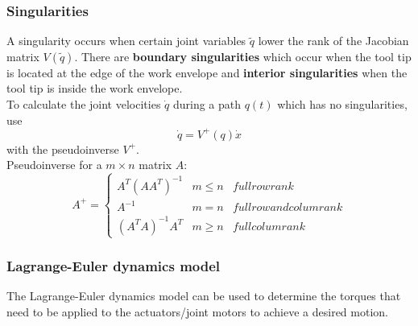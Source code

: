 \documentclass[12pt]{article}
\begin{document}
	\subsubsection{Singularities}
	A singularity occurs when certain joint variables $\tilde{q}$ lower the rank of the Jacobian matrix $V(\tilde{q})$. There are \textbf{boundary singularities} which occur when the tool tip is located at the edge of the work envelope and \textbf{interior singularities} when the tool tip is inside the work envelope.\\
	To calculate the joint velocities $\dot{q}$ during a path $q(t)$ which has no singularities, use $$\dot{q} = V^+(q) \dot{x}$$ with the pseudoinverse $V^+$.\\
	Pseudoinverse for a $m \times n$ matrix $A$:
	\begin{equation}
	A^+ = 
	\left\{ \begin{array}{lll}
	A^T(AA^T)^{-1} & m \leq n & full row rank\\
	A^{-1} & m = n & full row and colum rank\\
	(A^T A)^{-1} A^T & m \geq n & full colum rank
	\end{array} \right.
	\end{equation}
	
	\subsubsection{Lagrange-Euler dynamics model}
	The Lagrange-Euler dynamics model can be used to determine the torques that need to be applied to the actuators/joint motors to achieve a desired motion.
\end{document}
